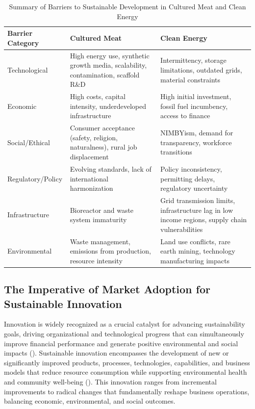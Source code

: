\begin{table}[h!]
	\centering
	\caption{Summary of Barriers to Sustainable Development in Cultured Meat and Clean Energy}
	\label{tab:barriers_summary}
	\begin{tabularx}{\textwidth}{@{}lXX@{}}
		\toprule
		\textbf{Barrier Category} & \textbf{Cultured Meat}                                                                     & \textbf{Clean Energy}                                                              \\ \midrule
		Technological             & High energy use, synthetic growth media, scalability, contamination, scaffold R\&D          & Intermittency, storage limitations, outdated grids, material constraints        \\ \addlinespace
		Economic                  & High costs, capital intensity, underdeveloped infrastructure                             & High initial investment, fossil fuel incumbency, access to finance             \\ \addlinespace
		Social/Ethical            & Consumer acceptance (safety, religion, naturalness), rural job displacement              & NIMBYism, demand for transparency, workforce transitions                       \\ \addlinespace
		Regulatory/Policy         & Evolving standards, lack of international harmonization                                  & Policy inconsistency, permitting delays, regulatory uncertainty                \\ \addlinespace
		Infrastructure            & Bioreactor and waste system immaturity                                                   & Grid transmission limits, infrastructure lag in low income regions, supply chain vulnerabilities \\ \addlinespace
		Environmental             & Waste management, emissions from production, resource intensity                          & Land use conflicts, rare earth mining, technology manufacturing impacts        \\ \bottomrule
	\end{tabularx}
\end{table}
	
	\subsection{The Imperative of Market Adoption for Sustainable Innovation}
	Innovation is widely recognized as a crucial catalyst for advancing sustainability goals, driving organizational and technological progress that can simultaneously improve financial performance and generate positive environmental and social impacts (\textcite{Boons2013, Schiederig2012}). Sustainable innovation encompasses the development of new or significantly improved products, processes, technologies, capabilities, and business models that reduce resource consumption while supporting environmental health and community well-being (\textcite{Adams2016}). This innovation ranges from incremental improvements to radical changes that fundamentally reshape business operations, balancing economic, environmental, and social outcomes.
	

